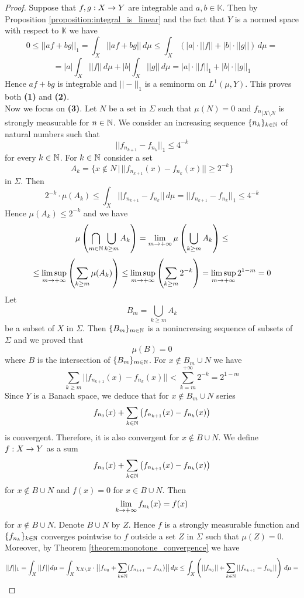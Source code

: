 \begin{proof}
Suppose that $f, g:X\rightarrow Y$ are integrable and $a, b\in \mathbb{K}$. Then by Proposition \ref{proposition:integral_is_linear} and the fact that $Y$ is a normed space with respect to $\mathbb{K}$ we have
$$0 \leq ||a f+ b g||_1 = \int_X||a f + b g||\,d\mu \leq \int_X\left(|a|\cdot ||f||+ |b|\cdot ||g||\right)\,d\mu= $$
$$= |a| \int_X||f||\,d\mu + |b| \int_X||g||\,d\mu = |a|\cdot ||f||_1+ |b|\cdot ||g||_1 $$
Hence $a f + b g$ is integrable and $||-||_1$ is a seminorm on $L^1(\mu,Y)$. This proves both \textbf{(1)} and \textbf{(2)}.\\
Now we focus on \textbf{(3)}. Let $N$ be a set in $\Sigma$ such that $\mu(N) = 0$ and ${f_n}_{\mid X\setminus N}$ is strongly measurable for $n\in {\mathbb N}$. We consider an increasing sequence $\{n_k\}_{k\in {\mathbb N}}$ of natural numbers such that
$$||f_{n_{k+1}} - f_{n_k}||_1\leq 4^{-k}$$
for every $k\in {\mathbb N}$. For $k\in {\mathbb N}$ consider a set
$$A_k = \big\{x \not \in N\,\big|\,||f_{n_{k+1}}(x) - f_{n_k}(x)||\geq 2^{-k}\big\}$$
in $\Sigma$. Then
$$2^{-k}\cdot \mu(A_k)\leq \int_X||f_{n_{k+1}}-f_{n_k}||\,d\mu = ||f_{n_{k+1}}-f_{n_k}||_1\leq 4^{-k}$$
Hence $\mu(A_k)\leq 2^{-k}$ and we have
$$\mu\left(\bigcap_{m\in {\mathbb N}}\bigcup_{k\geq m}A_k\right) = \lim_{m\rightarrow +\infty} \mu\left(\bigcup_{k\geq m}A_k\right)\leq $$
$$\leq \limsup_{m\rightarrow +\infty}\left(\sum_{k\geq m}\mu(A_k)\right) \leq \limsup_{m\rightarrow +\infty}\left(\sum_{k\geq m}2^{-k}\right) = \limsup_{m\rightarrow +\infty} 2^{1-m} = 0$$
Let
$$B_m = \bigcup_{k\geq m}A_k$$
be a subset of $X$ in $\Sigma$. Then $\{B_m\}_{m\in {\mathbb N}}$ is a nonincreasing sequence of subsets of $\Sigma$ and we proved that
$$\mu\left(B\right)=  0$$
where $B$ is the intersection of $\{B_m\}_{m\in {\mathbb N}}$. For $x\not \in B_m\cup N$ we have
$$\sum_{k\geq m}||f_{n_{k+1}}(x) - f_{n_k}(x)|| < \sum_{k=m}^{+\infty}2^{-k} = 2^{1-m}$$
Since $Y$ is a Banach space, we deduce that for $x\not \in B_m\cup N$ series
$$f_{n_0}(x) + \sum_{k\in {\mathbb N}}\left(f_{n_{k+1}}(x) - f_{n_k}(x)\right)$$
is convergent. Therefore, it is also convergent for $x\not \in B\cup N$. We define $f:X\rightarrow Y$ as a sum
$$f_{n_0}(x) + \sum_{k\in {\mathbb N}}\left(f_{n_{k+1}}(x) - f_{n_k}(x)\right)$$
for $x\not \in B\cup N$ and $f(x) = 0$ for $x\in B\cup N$. Then
$$\lim_{k\rightarrow +\infty}f_{n_k}(x) = f(x)$$
for $x \not \in B\cup N$. Denote $B\cup N$ by $Z$. Hence $f$ is a strongly measurable function and $\{f_{n_k}\}_{k\in {\mathbb N}}$ converges pointwise to $f$ outside a set $Z$ in $\Sigma$ such that $\mu(Z) = 0$. Moreover, by Theorem \ref{theorem:monotone_convergence} we have
$$||f||_1 = \int_X||f||\,d\mu = \int_X\chi_{X\setminus Z}\cdot \big|\big|f_{n_0} + \sum_{k\in {\mathbb N}}(f_{n_{k+1}} - f_{n_k})\big|\big|\,d\mu \leq \int_X\left(||f_{n_0}|| + \sum_{k\in {\mathbb N}}||f_{n_{k+1}}-f_{n_k}||\right)\,d\mu = $$

\end{proof}
